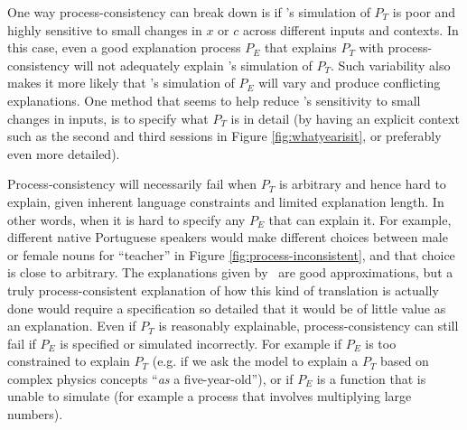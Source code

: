 

One way process-consistency can break down is if \DV's simulation of $P_T$ is poor and highly sensitive to small changes in $x$ or $c$ across different inputs and contexts. In this case, even a good explanation process $P_E$ that explains $P_T$ with process-consistency will not adequately explain \DV's simulation of $P_T$. Such variability also makes it more likely that \DV's simulation of $P_E$ will vary and produce conflicting explanations. 
One method that seems to help reduce {\DV}'s sensitivity to small changes in inputs, is to specify what $P_T$ is in detail (by having an explicit context such as the second and third sessions in Figure \ref{fig:whatyearisit}, or preferably even more detailed).


Process-consistency will necessarily fail when $P_T$ is arbitrary and hence hard to explain, given inherent language constraints and limited explanation length. In other words, when it is hard to specify any $P_E$ that can explain it. For example, different native Portuguese speakers would make different choices between male or female nouns for ``teacher'' in Figure \ref{fig:process-inconsistent}, and that choice is close to arbitrary.
The explanations given by \DV\ are good approximations, but a truly process-consistent explanation of how this kind of translation is actually done would require a specification so detailed that it would be of little value as an explanation. Even if $P_T$ is reasonably explainable, process-consistency can still fail if  $P_E$  is specified or simulated incorrectly. For example if $P_E$ is too constrained to explain $P_T$ (e.g. if we ask the model to explain a $P_T$ based on complex physics concepts ``{\it as} a five-year-old''), or if $P_E$ is a function that {\DV} is unable to simulate (for example a process that involves multiplying large numbers).

